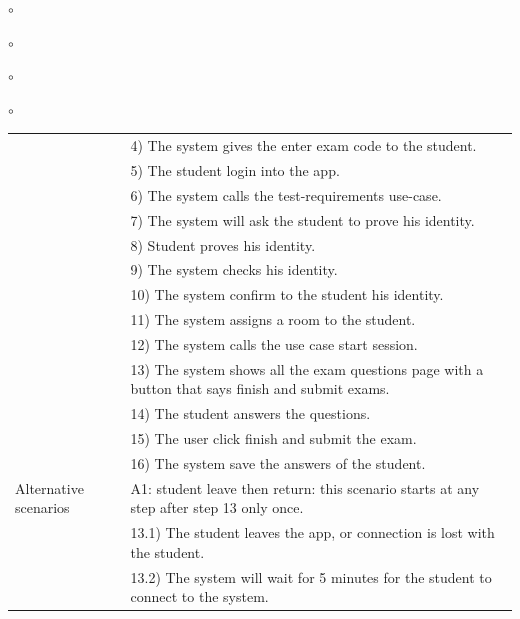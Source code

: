 \documentclass[]{uc2pfecaneva}
\begin{document}
\begin{list}{$\circ$}{}
\begin{list}{$\circ$}{}
\begin{list}{$\circ$}{}
\begin{list}{$\circ$}{}
\begin{table}[h]
\begin{tabularx}{\textwidth}{|l|X|}
            & 4) The system gives the enter exam code to the student.                                           \\
            & 5) The student login into the app.                                                                \\
            & 6) The system calls the test-requirements use-case.                                               \\
            & 7) The system will ask the student to prove his identity.                                         \\
            & 8) Student proves his identity.                                                                   \\
            & 9) The system checks his identity.                                                                \\
            & 10) The system confirm to the student his identity.                                               \\
            & 11) The system assigns a room to the student.                                                     \\
            & 12) The system calls the use case start session.                                                  \\
            & 13) The system shows all the exam questions page with a button that says finish and submit exams. \\
            & 14) The student answers the questions.                                                            \\
            & 15) The user click finish and submit the exam.                                                    \\
            & 16) The system save the answers of the student.                                                   \\ \hline
            Alternative scenarios
            & A1: student leave then return: this scenario starts at any step after step 13 only once.          \\
            & \hspace{4mm}13.1) The student leaves the app, or connection is lost with the student.             \\
            & \hspace{4mm}13.2) The system will wait for 5 minutes for the student to connect to the system.    \\

\end{tabularx}
\end{table}
\end{list}
\end{list}
\end{list}
\end{list}
\end{document}
